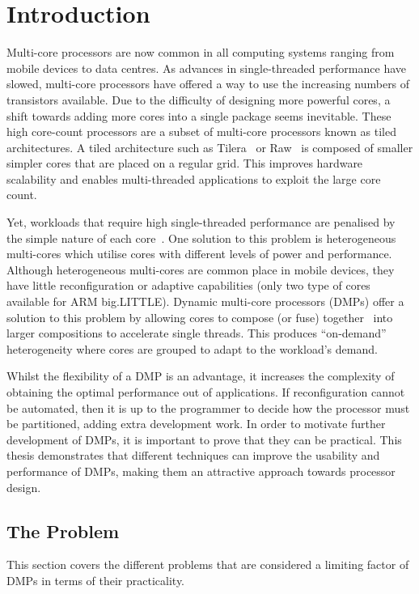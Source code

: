 \chapter{Introduction}
Multi-core processors are now common in all computing systems ranging from mobile devices to data centres.
As advances in single-threaded performance have slowed, multi-core processors have offered a way to use the increasing numbers of transistors available.
Due to the difficulty of designing more powerful cores, a shift towards adding more cores into a single package seems inevitable.
These high core-count processors are a subset of multi-core processors known as tiled architectures.
A tiled architecture such as Tilera~\cite{bell2008tile} or Raw~\cite{waingold1997raw} is composed of smaller simpler cores that are placed on a regular grid.
This improves hardware scalability and enables multi-threaded applications to exploit the large core count.

Yet, workloads that require high single-threaded performance are penalised by the simple nature of each core~\cite{eyerman2010amdahl}.
One solution to this problem is heterogeneous multi-cores which utilise cores with different levels of power and performance.
Although heterogeneous multi-cores are common place in mobile devices, they have little reconfiguration or adaptive capabilities (\eg only two type of cores available for ARM big.LITTLE).
Dynamic multi-core processors (DMPs) offer a solution to this problem by allowing cores to compose (or fuse) together~\cite{ipek2007CoreFusion} into larger compositions to accelerate single threads.
This produces ``on-demand'' heterogeneity where cores are grouped to adapt to the workload's demand.

Whilst the flexibility of a DMP is an advantage, it increases the complexity of obtaining the optimal performance out of applications.
If reconfiguration cannot be automated, then it is up to the programmer to decide how the processor must be partitioned, adding extra development work.
In order to motivate further development of DMPs, it is important to prove that they can be practical.
This thesis demonstrates that different techniques can improve the usability and performance of DMPs, making them an attractive approach towards processor design. 

\section{The Problem}
This section covers the different problems that are considered a limiting factor of DMPs in terms of their practicality.
